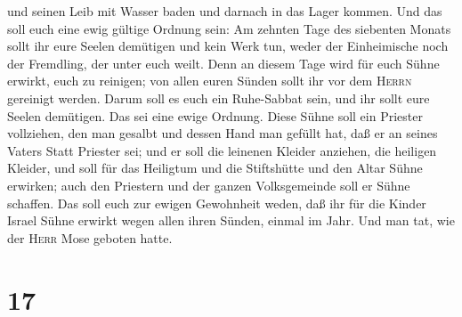 und seinen Leib mit Wasser baden und darnach in das Lager kommen.
 Und das soll euch eine ewig gültige Ordnung sein: Am
zehnten Tage des siebenten Monats sollt ihr eure Seelen demütigen und
kein Werk tun, weder der Einheimische noch der Fremdling, der unter euch
weilt.  Denn an diesem Tage wird für euch Sühne erwirkt,
euch zu reinigen; von allen euren Sünden sollt ihr vor dem
\textsc{Herrn} gereinigt werden.  Darum soll es euch ein
Ruhe-Sabbat sein, und ihr sollt eure Seelen demütigen. Das sei eine
ewige Ordnung.  Diese Sühne soll ein Priester vollziehen,
den man gesalbt und dessen Hand man gefüllt hat, daß er an seines Vaters
Statt Priester sei; und er soll die leinenen Kleider anziehen, die
heiligen Kleider,  und soll für das Heiligtum und die
Stiftshütte und den Altar Sühne erwirken; auch den Priestern und der
ganzen Volksgemeinde soll er Sühne schaffen.  Das soll
euch zur ewigen Gewohnheit weden, daß ihr für die Kinder Israel Sühne
erwirkt wegen allen ihren Sünden, einmal im Jahr. Und man tat, wie der
\textsc{Herr} Mose geboten hatte.

\hypertarget{section-16}{%
\section{17}\label{section-16}}

